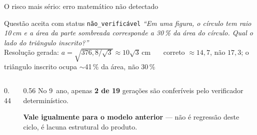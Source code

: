 \documentclass[aspectratio=169,11pt]{beamer}
\begin{document}
\begin{frame}{O risco mais sério: erro matemático não detectado}
  \begin{alertblock}{Questão aceita com status \texttt{não\_verificável}}
    \footnotesize
    \textit{``Em uma figura, o círculo tem raio 10\,cm e a área da parte
    sombreada corresponde a 30\,\% da área do círculo. Qual o lado do
    triângulo inscrito?''}\\[2pt]
    Resolução gerada: $a = \sqrt{376{,}8/\sqrt{3}} \approx 10\sqrt{3}$\,cm~~
    {\color{badred}\faTimesCircle}~correto $\approx 14{,}7$, não $17{,}3$;
    o triângulo inscrito ocupa $\sim$41\,\% da área, não 30\,\%
  \end{alertblock}
  \vspace{0.15cm}
  \begin{columns}[T]
    \begin{column}{0.44\textwidth}
      \begin{center}
      \end{center}
    \end{column}
    \begin{column}{0.56\textwidth}
      \small
      No 9\textordmasculine\ ano, apenas \textbf{2 de 19} gerações são
      conferíveis pelo verificador determinístico.

      \vspace{0.25cm}
      \textbf{Vale igualmente para o modelo anterior} — não é regressão
      deste ciclo, é lacuna estrutural do produto.
    \end{column}
  \end{columns}
\end{frame}
\end{document}
